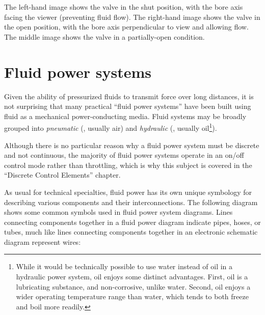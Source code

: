 The left-hand image shows the valve in the shut position, with the bore axis facing the viewer (preventing fluid flow).  The right-hand image shows the valve in the open position, with the bore axis perpendicular to view and allowing flow.  The middle image shows the valve in a partially-open condition.












\filbreak
\section{Fluid power systems}

\label{Fluid power systems}

Given the ability of pressurized fluids to transmit force over long distances, it is not surprising that many practical ``fluid power systems'' have been built using fluid as a mechanical power-conducting media.  Fluid systems may be broadly grouped into \textit{pneumatic} (, usually air) and \textit{hydraulic} (, usually oil\footnote{While it would be technically possible to use water instead of oil in a hydraulic power system, oil enjoys some distinct advantages.  First, oil is a lubricating substance, and non-corrosive, unlike water.  Second, oil enjoys a wider operating temperature range than water, which tends to both freeze and boil more readily.}).

Although there is no particular reason why a fluid power system must be discrete and not continuous, the majority of fluid power systems operate in an on/off control mode rather than throttling, which is why this subject is covered in the ``Discrete Control Elements'' chapter.

As usual for technical specialties, fluid power has its own unique symbology for describing various components and their interconnections.  The following diagram shows some common symbols used in fluid power system diagrams.  Lines connecting components together in a fluid power diagram indicate pipes, hoses, or tubes, much like lines connecting components together in an electronic schematic diagram represent wires:

